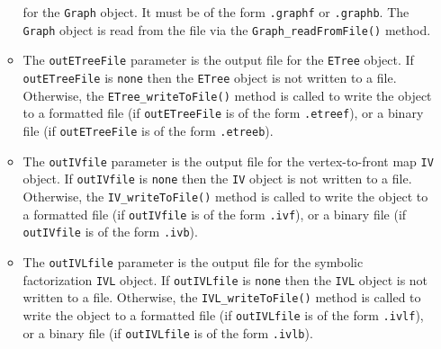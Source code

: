 \begin{enumerate}
\begin{itemize}
for the {\tt Graph} object. 
It must be of the form {\tt *.graphf} or {\tt *.graphb}.
The {\tt Graph} object is read from the file via the
{\tt Graph\_readFromFile()} method.
\item
The {\tt outETreeFile} parameter is the output file for the 
{\tt ETree} object. 
If {\tt outETreeFile} is {\tt none} then the {\tt ETree} object is not
written to a file. 
Otherwise, the {\tt ETree\_writeToFile()} method is called to write
the object to 
a formatted file (if {\tt outETreeFile} is of the form 
{\tt *.etreef}),
or
a binary file (if {\tt outETreeFile} is of the form {\tt *.etreeb}).
\item
The {\tt outIVfile} parameter is the output file for the 
vertex-to-front map {\tt IV} object. 
If {\tt outIVfile} is {\tt none} then the {\tt IV} object is not
written to a file. 
Otherwise, the {\tt IV\_writeToFile()} method is called to write
the object to a formatted file (if {\tt outIVfile} is of the form 
{\tt *.ivf}), or
a binary file (if {\tt outIVfile} is of the form {\tt *.ivb}).
\item
The {\tt outIVLfile} parameter is the output file for the 
symbolic factorization {\tt IVL} object. 
If {\tt outIVLfile} is {\tt none} then the {\tt IVL} object is not
written to a file. 
Otherwise, the {\tt IVL\_writeToFile()} method is called to write
the object to a formatted file (if {\tt outIVLfile} is of the form 
{\tt *.ivlf}), or
a binary file (if {\tt outIVLfile} is of the form {\tt *.ivlb}).
\end{itemize}
\end{enumerate}
